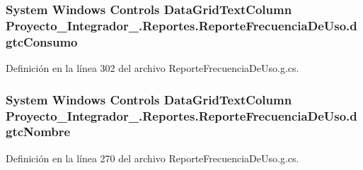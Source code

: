 \hypertarget{class_proyecto___integrador__3_1_1_reportes_1_1_reporte_frecuencia_de_uso_af2b92d2a2c7a62227fa89dc9bf22009b}{
\subsubsection[{dgtc\-Consumo}]{\setlength{\rightskip}{0pt plus 5cm}System Windows Controls Data\-Grid\-Text\-Column Proyecto\-\_\-\-Integrador\-\_.\-Reportes.\-Reporte\-Frecuencia\-De\-Uso.\-dgtc\-Consumo\hspace{0.3cm}{\ttfamily [package]}}}\label{class_proyecto___integrador__3_1_1_reportes_1_1_reporte_frecuencia_de_uso_af2b92d2a2c7a62227fa89dc9bf22009b}


Definición en la línea 302 del archivo Reporte\-Frecuencia\-De\-Uso.\-g.\-cs.

\hypertarget{class_proyecto___integrador__3_1_1_reportes_1_1_reporte_frecuencia_de_uso_ae9f936afc28740aa73600b6ebd3bb07c}{
\subsubsection[{dgtc\-Nombre}]{\setlength{\rightskip}{0pt plus 5cm}System Windows Controls Data\-Grid\-Text\-Column Proyecto\-\_\-\-Integrador\-\_.\-Reportes.\-Reporte\-Frecuencia\-De\-Uso.\-dgtc\-Nombre\hspace{0.3cm}{\ttfamily [package]}}}\label{class_proyecto___integrador__3_1_1_reportes_1_1_reporte_frecuencia_de_uso_ae9f936afc28740aa73600b6ebd3bb07c}


Definición en la línea 270 del archivo Reporte\-Frecuencia\-De\-Uso.\-g.\-cs.

